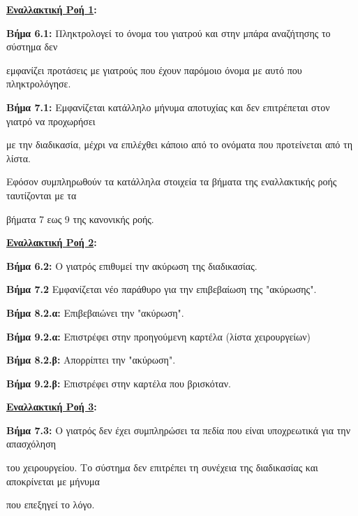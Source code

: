 \documentclass{article}
\begin{document}
 \textbf{\underline{Εναλλακτική Ροή 1}:} \vspace{0.2cm} 
\par \textbf{Βήμα 6.1:} Πληκτρολογεί το όνομα του γιατρού και στην μπάρα αναζήτησης το σύστημα δεν \par εμφανίζει προτάσεις με γιατρούς που έχουν παρόμοιο όνομα με αυτό που πληκτρολόγησε. \vspace{0.1cm}
\par \textbf{Βήμα 7.1:} Εμφανίζεται κατάλληλο μήνυμα αποτυχίας και δεν επιτρέπεται στον γιατρό να προχωρήσει \par με την διαδικασία, μέχρι να επιλέχθει κάποιο από το ονόματα που προτείνεται από τη λίστα.\vspace{0.1cm}
\par Εφόσον συμπληρωθούν τα κατάλληλα στοιχεία τα βήματα της εναλλακτικής ροής ταυτίζονται με τα \par βήματα 7 εως 9 της κανονικής ροής. \vspace{0.2cm}

\textbf{\underline{Εναλλακτική Ροή 2}:} \vspace{0.2cm}
\par \textbf{Βήμα 6.2:} Ο γιατρός επιθυμεί την ακύρωση της διαδικασίας. \vspace{0.1cm}
\par \textbf{Βήμα 7.2} Εμφανίζεται νέο παράθυρο για την επιβεβαίωση της  "ακύρωσης". \vspace{0.2cm}
\par \textbf{Βήμα 8.2.α:} Επιβεβαιώνει την "ακύρωση". \vspace{0.1cm}
\par \textbf{Βήμα 9.2.α:} Επιστρέφει στην προηγούμενη καρτέλα (λίστα χειρουργείων) \vspace{0.2cm}

\par \textbf{Βήμα 8.2.β:}  Απορρίπτει την "ακύρωση". \vspace{0.1cm}
\par \textbf{Βήμα 9.2.β:}  Επιστρέφει στην καρτέλα που βρισκόταν. \vspace{0.2cm}

\textbf{\underline{Εναλλακτική Ροή 3}:} \vspace{0.2cm} 
\par \textbf{Βήμα 7.3:} Ο γιατρός δεν έχει συμπληρώσει τα πεδία που είναι υποχρεωτικά για την απασχόληση \par του χειρουργείου. Το σύστημα δεν επιτρέπει τη συνέχεια της διαδικασίας και αποκρίνεται με μήνυμα \par που επεξηγεί το λόγο.
\end{document}
